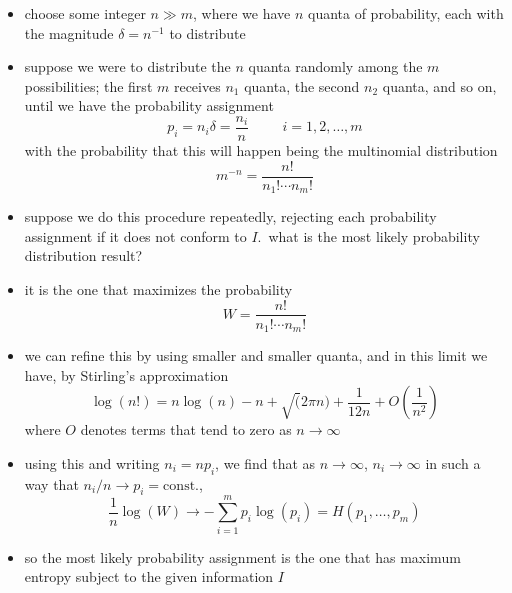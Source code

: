 \documentclass[../jaynes_prob_theory_notes.tex]{subfiles}
\begin{document}
\begin{itemize}
\begin{itemize}
                            \item choose some integer $n \gg m$, where we have $n$ quanta of probability, each with the magnitude $\delta = n^{-1}$ to distribute
                            \item suppose we were to distribute the $n$ quanta randomly among the $m$ possibilities; the first $m$ receives $n_1$ quanta, the second $n_2$ quanta, and so on, until we have the probability assignment
                                \begin{equation*} 
                                    p_i = n_i \delta = \frac{n_i}{n} \hspace{1cm} i = 1, 2, \ldots, m
                                \end{equation*}
                                with the probability that this will happen being the multinomial distribution
                                \begin{equation*} 
                                    m^{-n} = \frac{n!}{n_1! \cdots n_m!}
                                \end{equation*}
                            \item suppose we do this procedure repeatedly, rejecting each probability assignment if it does not conform to $I$.\ what is the most likely probability distribution result?
                            \item it is the one that maximizes the probability
                                \begin{equation*} 
                                    W = \frac{n!}{n_1! \cdots n_m!}
                                \end{equation*}
                            \item we can refine this by using smaller and smaller quanta, and in this limit we have, by Stirling's approximation
                                \begin{equation*} 
                                    \log (n!) = n\log (n) - n + \sqrt(2\pi n) + \frac{1}{12n} + O \left( \frac{1}{n^2} \right)
                                \end{equation*}
                                where $O$ denotes terms that tend to zero as $n \rightarrow \infty$
                            \item using this and writing $n_i = np_i$, we find that as $n \rightarrow \infty$, $n_i \rightarrow \infty$ in such a way that $n_i/n \rightarrow p_i = \mathrm{const.}$,
                                \begin{equation*} 
                                    \frac{1}{n} \log (W) \rightarrow - \sum\limits^{m}_{i=1} p_i \log (p_i) = H(p_1, \ldots, p_m)
                                \end{equation*}
                            \item so the most likely probability assignment is the one that has maximum entropy subject to the given information $I$
                        \end{itemize}
                \end{itemize}
\end{document}
